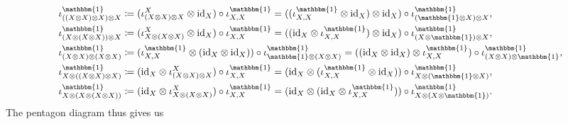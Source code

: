 \begin{example}
\begin{align*}
\begin{split}
\iota_{((X \otimes X) \otimes X) \otimes X}^{\mathbbm{1}} &\coloneqq (\iota_{(X \otimes X) \otimes X}^X \otimes \id_X) \circ \iota_{X,X}^{{\mathbbm{1}}} = ((\iota_{X,X}^{{\mathbbm{1}}} \otimes \id_X) \otimes \id_X) \circ \iota_{({\mathbbm{1}} \otimes X) \otimes X}^{\mathbbm{1}},\\
\iota_{(X \otimes (X \otimes X)) \otimes X}^{\mathbbm{1}} &\coloneqq (\iota_{X \otimes (X \otimes X)}^X \otimes \id_X) \circ \iota_{X,X}^{{\mathbbm{1}}} = ((\id_X \otimes \iota_{X,X}^{{\mathbbm{1}}}) \otimes \id_X) \circ \iota_{(X \otimes {\mathbbm{1}}) \otimes X}^{\mathbbm{1}},\\
\iota_{(X \otimes X) \otimes (X \otimes X)}^{\mathbbm{1}} &\coloneqq (\iota_{X,X}^{{\mathbbm{1}}} \otimes (\id_X \otimes \id_X)) \circ \iota_{{\mathbbm{1}} \otimes (X \otimes X)}^{\mathbbm{1}} = ((\id_X \otimes \id_X) \otimes \iota_{X,X}^{{\mathbbm{1}}}) \circ \iota_{(X \otimes X) \otimes {\mathbbm{1}}}^{\mathbbm{1}},\\ %
\iota_{X \otimes ((X \otimes X) \otimes X)}^{\mathbbm{1}} &\coloneqq (\id_X \otimes \iota_{(X \otimes X) \otimes X}^X) \circ \iota_{X,X}^{{\mathbbm{1}}} = (\id_X \otimes (\iota_{X,X}^{\mathbbm{1}} \otimes \id_X)) \circ \iota_{X \otimes ({\mathbbm{1}} \otimes X)}^{\mathbbm{1}},\\
\iota_{X \otimes (X \otimes (X \otimes X))}^{\mathbbm{1}} &\coloneqq (\id_X \otimes \iota_{X \otimes (X \otimes X)}^X) \circ \iota_{X,X}^{{\mathbbm{1}}} = (\id_X \otimes (\id_X \otimes \iota_{X,X}^{{\mathbbm{1}}})) \circ \iota_{X \otimes (X \otimes {\mathbbm{1}})}^{\mathbbm{1}}.
\end{split}
\end{align*}
\noindent The pentagon diagram thus gives us
\begin{center}
\end{center}
\end{example}
